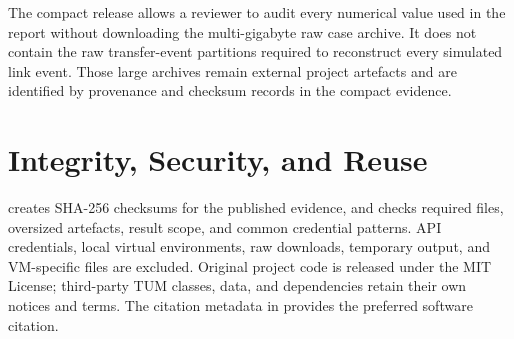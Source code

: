 The compact release allows a reviewer to audit every numerical value used in the report without downloading the multi-gigabyte raw case archive. It does not contain the raw transfer-event partitions required to reconstruct every simulated link event. Those large archives remain external project artefacts and are identified by provenance and checksum records in the compact evidence.

\section{Integrity, Security, and Reuse}

 creates SHA-256 checksums for the published evidence, and  checks required files, oversized artefacts, result scope, and common credential patterns. API credentials, local virtual environments, raw downloads, temporary output, and VM-specific files are excluded. Original project code is released under the MIT License; third-party TUM classes, data, and dependencies retain their own notices and terms. The citation metadata in  provides the preferred software citation.
